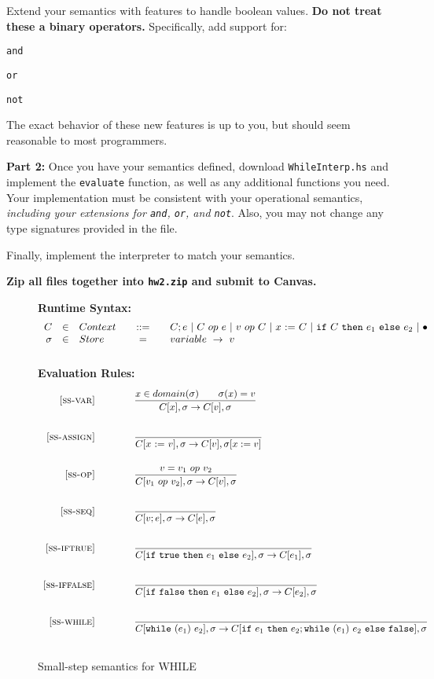 \documentclass{article}
\begin{document}
Extend your semantics with features to handle boolean values.
{\bf Do not treat these a binary operators.}
Specifically, add support for:
\begin{compactitem}
  \item {\tt and}
  \item {\tt or}
  \item {\tt not}
\end{compactitem}

The exact behavior of these new features is up to you,
but should seem reasonable to most programmers.

\bigskip
\noindent
{\bf Part 2:}
Once you have your semantics defined,
download {\tt WhileInterp.hs} and implement the {\tt evaluate} function,
as well as any additional functions you need.
Your implementation must be consistent with your operational semantics,
{\it including your extensions for {\tt and}, {\tt or}, and {\tt not}}.
Also, you may not change any type signatures provided in the file.

Finally, implement the interpreter to match your semantics.

\bigskip
\newcommand{\notE}[1]{\mbox{\tt not}~#1}
\newcommand{\orE}[2]{\mbox{\tt or}~#1~#2}
\newcommand{\andE}[2]{\mbox{\tt and}~#1~#2}

{\bf Zip all files together into {\tt hw2.zip} and submit to Canvas.}





\begin{figure}[H]\label{fig:smallstep}
\caption{Small-step semantics for WHILE}
{\bf Runtime Syntax:}
\[
\begin{array}{rclcl}
  C & \in & {Context} \quad & ::= & \quad C; e
        ~|~ C ~op~ e
        ~|~ v ~op~ C
        ~|~ x~{:=}~C
        ~|~ \mbox{\tt if}~{C}~\mbox{\tt then}~{e_1}~\mbox{\tt else}~{e_2}
        ~|~ \bullet \\
  \sigma & \in & {Store} \quad  & = & \quad {variable} ~\rightarrow ~v \\
  \\
\end{array}
\]
{\bf Evaluation Rules:~~~ } \\
\[
\begin{array}{r@{\qquad\qquad}l}
\ssrule{ss-var}{
  x \in domain(\sigma) \qquad \sigma(x)=v
}{
  \sstep{x}{\sigma}{v}{\sigma}
}
\ssrule{ss-assign}{
}{
  \sstep{\assign{x}{v}}{\sigma}{v}{\sigma[x:=v]}
}
\ssrule{ss-op}{
  v = v_1 ~op~ v_2
}{
  \sstep{v_1~op~v_2}{\sigma}{v}{\sigma}
}
\ssrule{ss-seq}{
}{
  \sstep{v;e}{\sigma}{e}{\sigma}
}
\ssrule{ss-iftrue}{
}{
  \sstep{\ife{\true}{e_1}{e_2}}{\sigma}{e_1}{\sigma}
}
\ssrule{ss-iffalse}{
}{
  \sstep{\ife{\false}{e_1}{e_2}}{\sigma}{e_2}{\sigma}
}
\ssrule{ss-while}{
}{
  \sstep{\whilee{e_1}{e_2}}{\sigma}{\ife{e_1}{e_2;\whilee{e_1}{e_2}}{\false}}{\sigma}
}
\end{array}
\]
\end{figure}
\end{document}
